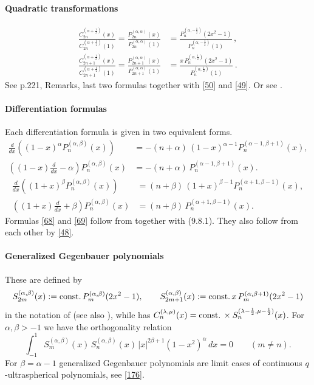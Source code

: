 \documentclass[envcountchap,graybox]{svmono}
\newcounter{rom}
\newcommand\al\alpha
\newcommand\be\beta
\newcommand\la\lambda
\newcommand\half{\frac12}
\newcommand\const{{\rm const.}\,}
\begin{document}
\paragraph{Quadratic transformations}
\begin{align}
\frac{C_{2n}^{(\al+\half)}(x)}{C_{2n}^{(\al+\half)}(1)}
=\frac{P_{2n}^{(\al,\al)}(x)}{P_{2n}^{(\al,\al)}(1)}
&=\frac{P_n^{(\al,-\half)}(2x^2-1)}{P_n^{(\al,-\half)}(1)}\,,
\label{51}\\
\frac{C_{2n+1}^{(\al+\half)}(x)}{C_{2n+1}^{(\al+\half)}(1)}
=\frac{P_{2n+1}^{(\al,\al)}(x)}{P_{2n+1}^{(\al,\al)}(1)}
&=\frac{x\,P_n^{(\al,\half)}(2x^2-1)}{P_n^{(\al,\half)}(1)}\,.
\label{52}
\end{align}
See p.221, Remarks, last two formulas together with \eqref{50} and \eqref{49}.
Or see .
%
\paragraph{Differentiation formulas}
Each differentiation formula is given in two equivalent forms.
\begin{equation}
\begin{split}
\frac d{dx}\left((1-x)^\al P_n^{(\al,\be)}(x)\right)&=
-(n+\al)\,(1-x)^{\al-1} P_n^{(\al-1,\be+1)}(x),\\
\left((1-x)\frac d{dx}-\al\right)P_n^{(\al,\be)}(x)&=
-(n+\al)\,P_n^{(\al-1,\be+1)}(x).
\end{split}
\label{68}
\end{equation}
%
\begin{equation}
\begin{split}
\frac d{dx}\left((1+x)^\be P_n^{(\al,\be)}(x)\right)&=
(n+\be)\,(1+x)^{\be-1} P_n^{(\al+1,\be-1)}(x),\\
\left((1+x)\frac d{dx}+\be\right)P_n^{(\al,\be)}(x)&=
(n+\be)\,P_n^{(\al+1,\be-1)}(x).
\end{split}
\label{69}
\end{equation}
Formulas \eqref{68} and \eqref{69} follow from
together with (9.8.1). They also follow from each other by \eqref{48}.
%
\paragraph{Generalized Gegenbauer polynomials}
These are defined by
\begin{equation}
S_{2m}^{(\al,\be)}(x):=\const P_m^{(\al,\be)}(2x^2-1),\qquad
S_{2m+1}^{(\al,\be)}(x):=\const x\,P_m^{(\al,\be+1)}(2x^2-1)
\label{70}
\end{equation}
in the notation of 
(see also \cite{K27}), while \cite[Section 1.5.2]{K26}
has $C_n^{(\la,\mu)}(x)=\const\allowbreak\times S_n^{(\la-\half,\mu-\half)}(x)$.
For $\al,\be>-1$ we have the orthogonality relation
\begin{equation}
\int_{-1}^1 S_m^{(\al,\be)}(x)\,S_n^{(\al,\be)}(x)\,|x|^{2\be+1}(1-x^2)^\al\,dx
=0\qquad(m\ne n).
\label{71}
\end{equation}
For $\be=\al-1$ generalized Gegenbauer polynomials are limit cases of
continuous $q$-ultraspherical polynomials, see \eqref{176}.
\end{document}
